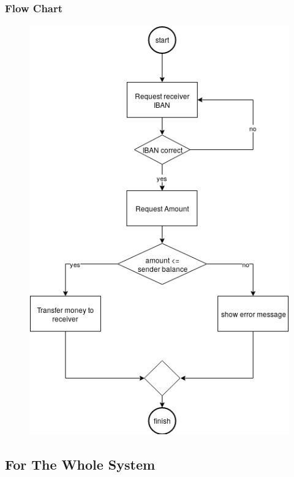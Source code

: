 \documentclass{article}
\begin{document}
		\newpage\subsubsection{Flow Chart}
		\begin{figure}[h!]
			\begin{center}
				\includegraphics[height=\linewidth]{img/transfer_flowchart.png}
			\end{center}
		\end{figure}
	\newpage\subsection{For The Whole System}
\end{document}
